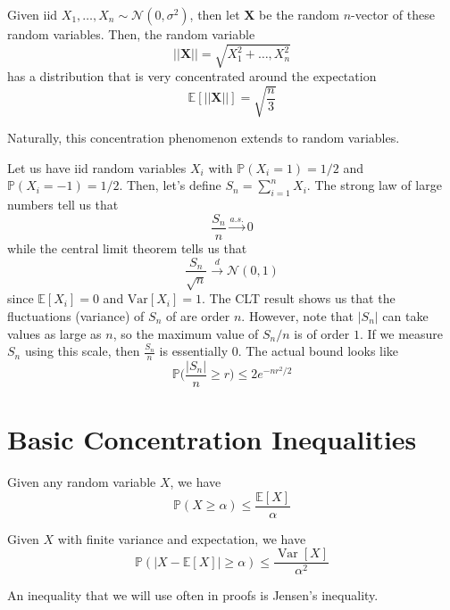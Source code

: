 \documentclass{article}
\DeclareMathOperator{\Var}{Var}
\begin{document}
\begin{example}
Given iid $X_1, \ldots, X_n \sim \mathcal{N}(0, \sigma^2)$, then let $\mathbf{X}$ be the random $n$-vector of these random variables. Then, the random variable 
\[||\mathbf{X}|| = \sqrt{X_1^2 + \ldots, X_n^2}\]
has a distribution that is very concentrated around the expectation 
\[\mathbb{E}[||\mathbf{X}||] = \sqrt{\frac{n}{3}}\]
\end{example}

Naturally, this concentration phenomenon extends to random variables. 

\begin{example}
Let us have iid random variables $X_i$ with $\mathbb{P}(X_i = 1) = 1/2$ and $\mathbb{P}(X_i = -1) = 1/2$. Then, let's define $S_n = \sum_{i=1}^n X_i$. The strong law of large numbers tell us that 
\[\frac{S_n}{n} \xrightarrow{a.s.} 0\]
while the central limit theorem tells us that 
\[\frac{S_n}{\sqrt{n}} \xrightarrow{d} \mathcal{N}(0, 1)\]
since $\mathbb{E}[X_i] = 0$ and $\mathrm{Var}[X_i] = 1$. The CLT result shows us that the fluctuations (variance) of $S_n$ of are order $n$. However, note that $|S_n|$ can take values as large as $n$, so the maximum value of $S_n / n$ is of order $1$. If we measure $S_n$ using this scale, then $\frac{S_n}{n}$ is essentially $0$. The actual bound looks like 
\[\mathbb{P} \bigg( \frac{|S_n|}{n} \geq r \bigg) \leq 2 e^{-n r^2 / 2}\]
\end{example}

\section{Basic Concentration Inequalities}

\begin{lemma}
Given any random variable $X$, we have 
\[\mathbb{P}(X \geq \alpha) \leq \frac{\mathbb{E}[X]}{\alpha}\]
\end{lemma}

\begin{lemma}
Given $X$ with finite variance and expectation, we have 
\[\mathbb{P}(|X - \mathbb{E}[X]| \geq \alpha) \leq \frac{\Var[X]}{\alpha^2}\]
\end{lemma}

An inequality that we will use often in proofs is Jensen's inequality. 
\end{document}
